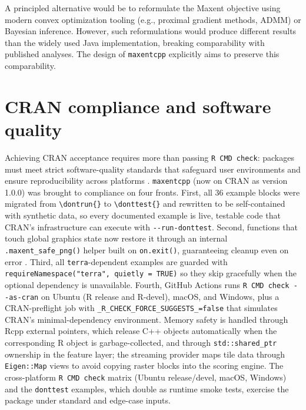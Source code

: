 \documentclass[10pt,letterpaper]{article}
\begin{document}
A principled alternative would be to reformulate the Maxent objective
using modern convex optimization tooling (e.g., proximal gradient
methods, ADMM) or Bayesian inference. However, such reformulations would
produce different results than the widely used Java implementation,
breaking comparability with published analyses. The design of
\texttt{maxentcpp} explicitly aims to preserve this comparability.

\section*{CRAN compliance and software
quality}

Achieving CRAN acceptance requires more than passing
\texttt{R\ CMD\ check}: packages must meet strict software-quality
standards that safeguard user environments and ensure reproducibility
across platforms \cite{CRANPolicy2024,WRE2024}. \texttt{maxentcpp}
(now on CRAN as version 1.0.0) was brought to compliance on four fronts.
First, all 36 example blocks were migrated from
\texttt{\textbackslash{}dontrun\{\}} to
\texttt{\textbackslash{}donttest\{\}} \cite{CRANcookbook2024} and
rewritten to be self-contained with synthetic data, so every documented
example is live, testable code that CRAN's infrastructure can execute
with \texttt{-\/-run-donttest}. Second, functions that touch global
graphics state now restore it through an internal
\texttt{.maxent\_safe\_png()} helper built on \texttt{on.exit()},
guaranteeing cleanup even on error \cite{WRE2024}. Third, all
\texttt{terra}-dependent examples are guarded with
\texttt{requireNamespace("terra",\ quietly\ =\ TRUE)} so they skip
gracefully when the optional dependency is unavailable. Fourth, GitHub
Actions runs \texttt{R\ CMD\ check\ -\/-as-cran} on Ubuntu (R release
and R-devel), macOS, and Windows, plus a CRAN-preflight job with
\texttt{\_R\_CHECK\_FORCE\_SUGGESTS\_=false} that simulates CRAN's
minimal-dependency environment. Memory safety is handled through Rcpp
external pointers, which release C++ objects automatically when the
corresponding R object is garbage-collected, and through
\texttt{std::shared\_ptr} ownership in the feature layer; the streaming
provider maps tile data through \texttt{Eigen::Map} views to avoid
copying raster blocks into the scoring engine. The cross-platform
\texttt{R\ CMD\ check} matrix (Ubuntu release/devel, macOS, Windows) and
the \texttt{donttest} examples, which double as runtime smoke tests,
exercise the package under standard and edge-case inputs.
\end{document}
